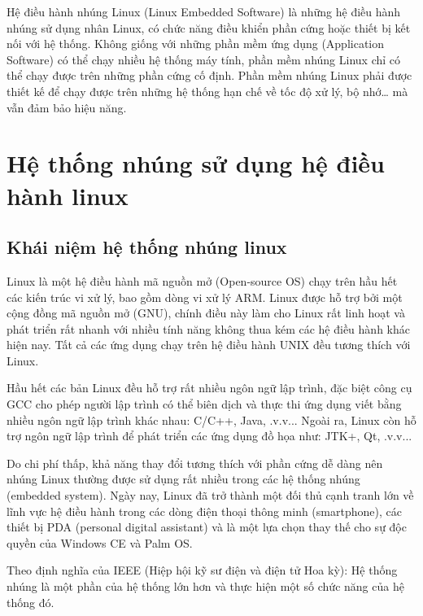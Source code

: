 \documentclass{report}
\begin{document}
Hệ điều hành nhúng Linux (Linux Embedded Software) là những hệ điều hành nhúng sử dụng nhân Linux, có chức năng điều khiển phần cứng hoặc thiết bị kết nối với hệ thống. Không giống với những phần mềm ứng dụng (Application Software) có thể chạy nhiều hệ thống máy tính, phần mềm nhúng Linux chỉ có thể chạy được trên những phần cứng cố định. Phần mềm nhúng Linux phải được thiết kế để chạy được trên những hệ thống hạn chế về tốc độ xử lý, bộ nhớ… mà vẫn đảm bảo hiệu năng.
\section{Hệ thống nhúng sử dụng hệ điều hành linux}
\subsection{Khái niệm hệ thống nhúng linux}

Linux là một hệ điều hành mã nguồn mở (Open-source OS) chạy trên hầu hết các kiến trúc vi xử lý, bao gồm dòng vi xử lý ARM. Linux được hỗ trợ bởi một cộng đồng mã nguồn mở (GNU), chính điều này làm cho Linux rất linh hoạt và phát triển rất nhanh với nhiều tính năng không thua kém các hệ điều hành khác hiện nay. Tất cả các ứng dụng chạy trên hệ điều hành UNIX đều tương thích với Linux.

Hầu hết các bản Linux đều hỗ trợ rất nhiều ngôn ngữ lập trình, đặc biệt công cụ GCC cho phép người lập trình có thể biên dịch và thực thi ứng dụng viết bằng nhiều ngôn ngữ lập trình khác nhau: C/C++, Java, .v.v... Ngoài ra, Linux còn hỗ trợ ngôn ngữ lập trình để phát triển các ứng dụng đồ họa như: JTK+, Qt, .v.v...

Do chi phí thấp, khả năng thay đổi tương thích với phần cứng dễ dàng nên nhúng Linux thường được sử dụng rất nhiều trong các hệ thống nhúng (embedded system). Ngày nay, Linux đã trở thành một đối thủ cạnh tranh lớn về lĩnh vực hệ điều hành trong các dòng điện thoại thông minh (smartphone), các thiết bị PDA (personal digital assistant) và là một lựa chọn thay thế cho sự độc quyền của Windows CE và Palm OS.

Theo định nghĩa của IEEE (Hiệp hội kỹ sư điện và điện tử Hoa kỳ): Hệ thống nhúng là một phần của hệ thống lớn hơn và thực hiện một số chức năng của hệ thống đó.
\end{document}
